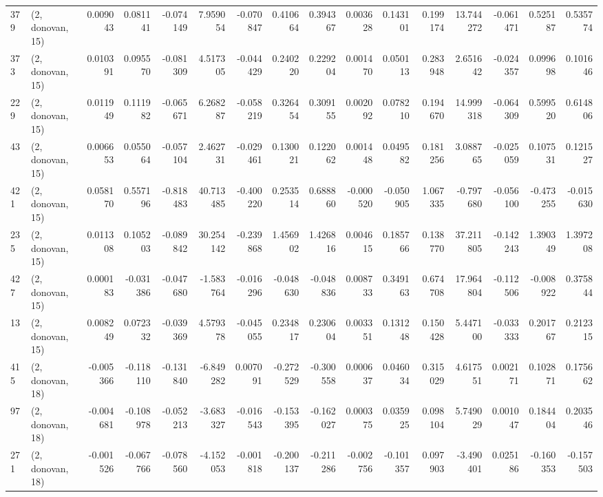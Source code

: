 \begin{tabular}{llrrrrrrrrrrrrrr}
379 &  (2, donovan, 15) &   0.009043 &  0.081141 & -0.074149 &    7.959054 & -0.070847 &   0.410664 &  0.394367 &  0.003628 &  0.143101 &  0.199174 &   13.744272 & -0.061471 &  0.525187 &  0.535774 \\
373 &  (2, donovan, 15) &   0.010391 &  0.095570 & -0.081309 &    4.517305 & -0.044429 &   0.240220 &  0.229204 &  0.001470 &  0.050113 &  0.283948 &    2.651642 & -0.024357 &  0.099698 &  0.101646 \\
229 &  (2, donovan, 15) &   0.011949 &  0.111982 & -0.065671 &    6.268287 & -0.058219 &   0.326454 &  0.309155 &  0.002092 &  0.078210 &  0.194670 &   14.999318 & -0.064309 &  0.599520 &  0.614806 \\
43  &  (2, donovan, 15) &   0.006653 &  0.055064 & -0.057104 &    2.462731 & -0.029461 &   0.130021 &  0.122062 &  0.001448 &  0.049582 &  0.181256 &    3.088765 & -0.025059 &  0.107531 &  0.121527 \\
421 &  (2, donovan, 15) &   0.058170 &  0.557196 & -0.818483 &   40.713485 & -0.400220 &   0.253514 &  0.688860 & -0.000520 & -0.050905 &  1.067335 &   -0.797680 & -0.056100 & -0.473255 & -0.015630 \\
235 &  (2, donovan, 15) &   0.011308 &  0.105203 & -0.089842 &   30.254142 & -0.239868 &   1.456902 &  1.426816 &  0.004615 &  0.185766 &  0.138770 &   37.211805 & -0.142243 &  1.390349 &  1.397208 \\
427 &  (2, donovan, 15) &   0.000183 & -0.031386 & -0.047680 &   -1.583764 & -0.016296 &  -0.048630 & -0.048836 &  0.008733 &  0.349163 &  0.674708 &   17.964804 & -0.112506 & -0.008922 &  0.375844 \\
13  &  (2, donovan, 15) &   0.008249 &  0.072332 & -0.039369 &    4.579378 & -0.045055 &   0.234817 &  0.230604 &  0.003351 &  0.131248 &  0.150428 &    5.447100 & -0.033333 &  0.201767 &  0.212315 \\
415 &  (2, donovan, 18) &  -0.005366 & -0.118110 & -0.131840 &   -6.849282 &  0.007091 &  -0.272529 & -0.300558 &  0.000637 &  0.046034 &  0.315029 &    4.617551 &  0.002171 &  0.102871 &  0.175662 \\
97  &  (2, donovan, 18) &  -0.004681 & -0.108978 & -0.052213 &   -3.683327 & -0.016543 &  -0.153395 & -0.162027 &  0.000375 &  0.035925 &  0.098104 &    5.749029 &  0.001047 &  0.184404 &  0.203546 \\
271 &  (2, donovan, 18) &  -0.001526 & -0.067766 & -0.078560 &   -4.152053 & -0.001818 &  -0.200137 & -0.211286 & -0.002756 & -0.101357 &  0.097903 &   -3.490401 &  0.025186 & -0.160353 & -0.157503 \\

\end{tabular}
